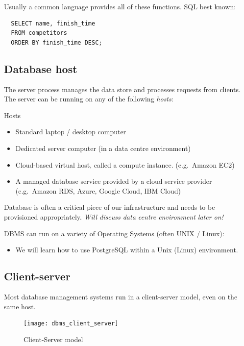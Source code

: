 \documentclass[slides]{pgnotes}
\begin{document}
Usually a common language provides all of these functions.
SQL best known:

\begin{verbatim}
  SELECT name, finish_time
  FROM competitors
  ORDER BY finish_time DESC;
\end{verbatim}

\subsection{Database host}

The server process manages the data store and processes requests from clients.
The server can be running on any of the following \emph{hosts}:

\begin{greenbox}{Hosts}
  \begin{itemize}
  \item
    Standard laptop / desktop computer
  \item
    Dedicated server computer (in a data centre environment)
  \item
    Cloud-based virtual host, called a compute instance. (e.g.~Amazon EC2)
  \item
    A managed database service provided by a cloud service provider
    (e.g.~Amazon RDS, Azure, Google Cloud, IBM Cloud)
  \end{itemize}
\end{greenbox}

Database is often a critical piece of our infrastructure and needs to be provisioned appropriately. \textit{Will discuss data centre environment later on!}

DBMS can run on a variety of Operating Systems (often UNIX / Linux):
\begin{itemize}
\item We will learn how to use PostgreSQL within a Unix (Linux) environment.
\end{itemize}



\subsection{Client-server}\label{client-server}

Most database management systems run in a client-server model, even on the same host.

\begin{figure}[htbp]
  \centering
  \texttt{[image: dbms\_client\_server]}
  \caption{Client-Server model}
  \label{fig:client-server-model}
\end{figure}
\end{document}
